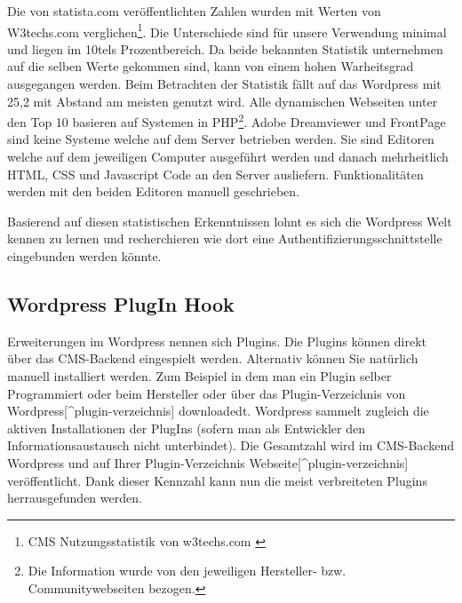 Die von statista.com veröffentlichten Zahlen wurden mit Werten von
W3techs.com verglichen\footnote{CMS Nutzungsstatistik von w3techs.com
  \autocite{statisticinfow3techs}}. Die Unterschiede sind für unsere
Verwendung minimal und liegen im 10tels Prozentbereich. Da beide
bekannten Statistik unternehmen auf die selben Werte gekommen sind, kann
von einem hohen Warheitsgrad ausgegangen werden. Beim Betrachten der
Statistik fällt auf das Wordpress mit 25,2 mit Abstand am meisten
genutzt wird. Alle dynamischen Webseiten unter den Top 10 basieren auf
Systemen in PHP\footnote{Die Information wurde von den jeweiligen
  Hersteller- bzw. Communitywebseiten bezogen.}. Adobe Dreamviewer und
FrontPage sind keine Systeme welche auf dem Server betrieben werden. Sie
sind Editoren welche auf dem jeweiligen Computer ausgeführt werden und
danach mehrheitlich HTML, CSS und Javascript Code an den Server
ausliefern. Funktionalitäten werden mit den beiden Editoren manuell
geschrieben.

Basierend auf diesen statistischen Erkenntnissen lohnt es sich die
Wordpress Welt kennen zu lernen und recherchieren wie dort eine
Authentifizierungsschnittstelle eingebunden werden könnte.

\subsection{Wordpress PlugIn Hook}\label{wordpress-plugin-hook}

Erweiterungen im Wordpress nennen sich Plugins. Die Plugins können
direkt über das CMS-Backend eingespielt werden. Alternativ können Sie
natürlich manuell installiert werden. Zum Beispiel in dem man ein Plugin
selber Programmiert oder beim Hersteller oder über das
Plugin-Verzeichnis von Wordpress{[}\^{}plugin-verzeichnis{]}
downloadedt. Wordpress sammelt zugleich die aktiven Installationen der
PlugIns (sofern man als Entwickler den Informationsaustausch nicht
unterbindet). Die Gesamtzahl wird im CMS-Backend Wordpress und auf Ihrer
Plugin-Verzeichnis Webseite{[}\^{}plugin-verzeichnis{]} veröffentlicht.
Dank dieser Kennzahl kann nun die meist verbreiteten Plugins
herrausgefunden werden.

